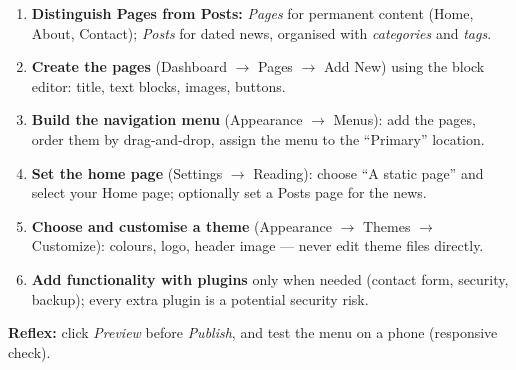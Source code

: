 \documentclass[11pt]{article}
\begin{document}
\begin{methode}
\begin{enumerate}
\item \textbf{Distinguish Pages from Posts:} \emph{Pages} for permanent content (Home, About, Contact); \emph{Posts} for dated news, organised with \emph{categories} and \emph{tags}.
\item \textbf{Create the pages} (Dashboard $\rightarrow$ Pages $\rightarrow$ Add New) using the block editor: title, text blocks, images, buttons.
\item \textbf{Build the navigation menu} (Appearance $\rightarrow$ Menus): add the pages, order them by drag-and-drop, assign the menu to the ``Primary'' location.
\item \textbf{Set the home page} (Settings $\rightarrow$ Reading): choose ``A static page'' and select your Home page; optionally set a Posts page for the news.
\item \textbf{Choose and customise a theme} (Appearance $\rightarrow$ Themes $\rightarrow$ Customize): colours, logo, header image — never edit theme files directly.
\item \textbf{Add functionality with plugins} only when needed (contact form, security, backup); every extra plugin is a potential security risk.
\end{enumerate}
\textbf{Reflex:} click \emph{Preview} before \emph{Publish}, and test the menu on a phone (responsive check).
\end{methode}
\end{document}
